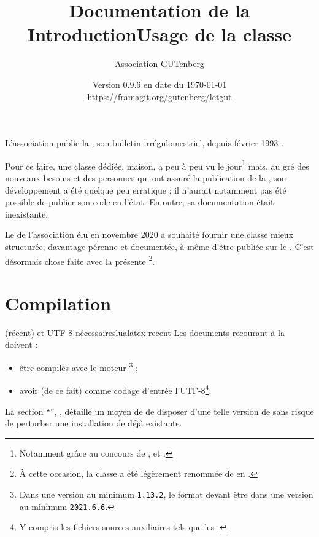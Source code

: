 \documentclass{letgut}
\title{%
  Documentation de la
  \texorpdfstring{%
    \letgutcls%
  }{%
    classe letgut%
  }%
}
\author{Association GUTenberg}
\date{%
  Version 0.9.6 en date du \today%
  \texorpdfstring{%
    \\
    \url{https://framagit.org/gutenberg/letgut}%
  }{%
  }%
}
\begin{document}

\title{Introduction}
\label{sec:introduction}
L'association \gutenberg{} publie la , son bulletin irrégulomestriel,
depuis février 1993 \autocite{AssociationGUTenbergLettreGUTenberg}.

Pour ce faire, une classe  dédiée, maison, a peu à peu vu le
jour\footnote{Notamment grâce au concours de ,
   et .} mais, au gré des
nouveaux besoins et des personnes qui ont assuré la publication de la ,
son développement a été quelque peu erratique ; il n'aurait notamment pas été
possible de publier son code en l'état. En outre, sa documentation était
inexistante.

Le \ca{} de l'association élu en novembre 2020 a souhaité fournir une classe
mieux structurée, davantage pérenne et documentée, à même d'être publiée sur le
\ctan{}. C'est désormais chose faite avec la présente \footnote{À
  cette occasion, la classe a été légèrement renommée de  en
  .}.

\title{Usage de la classe }
\label{sec:usage-de-la}

\section{Compilation}
\label{sec:compilation}

\begin{dbwarning}{ (récent) et UTF-8 nécessaires}{lualatex-recent}
  Les documents recourant à la  doivent :
  \begin{itemize}
  \item être compilés avec le moteur \footnote{Dans une version
      au minimum \texttt{1.13.2}, le format  devant être dans
      une version au minimum \texttt{2021.6.6}.} ;
  \item avoir (de ce fait) comme codage d'entrée l'UTF-8\footnote{Y compris les
      fichiers sources auxiliaires tels que les .}.
  \end{itemize}
\end{dbwarning}

La section \enquote{}, ,
détaille un moyen de de disposer d'une telle version de  sans
risque de perturber une installation de  déjà existante.
\end{document}
